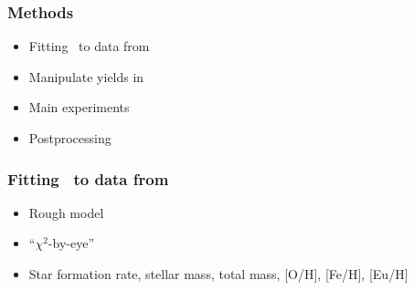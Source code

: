 \begin{frame}
\frametitle{Methods}
\begin{itemize}
\item Fitting \omegamodel\ to data from \eris
\item Manipulate yields in \omegamodel
\item Main experiments
\item Postprocessing
\end{itemize}
\end{frame}

\begin{frame}
  \frametitle{Fitting \omegamodel\ to data from \eris}
  \begin{minipage}{0.45\linewidth}
    \begin{itemize}
    \item Rough model
    \item ``$\chi^2$-by-eye''
    \item Star formation rate, stellar mass, total mass, [O/H], [Fe/H], [Eu/H]
    \end{itemize}
  \end{minipage}
  \hfill
\end{frame}

